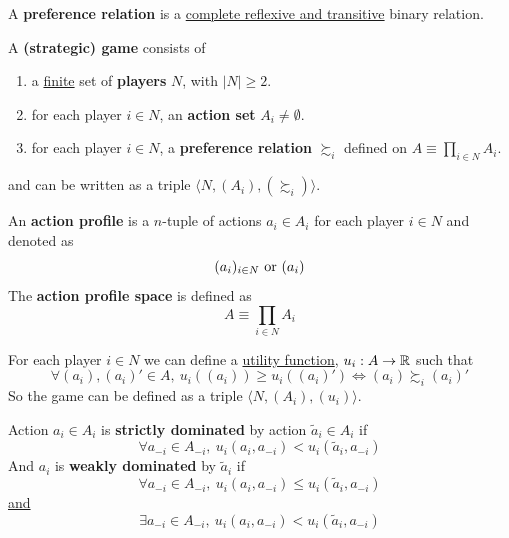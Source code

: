 \documentclass[11pt]{article}
\begin{document}
		\begin{definition}[pg.7]
			A \textbf{preference relation} is a \ul{complete reflexive and transitive} binary relation.
		\end{definition}
		
		\begin{definition}[11.1, lec.1]
			A \textbf{(strategic) game} consists of
			\begin{enumerate}[i]
				\item a \ul{finite} set of \textbf{players} $N$, with $|N| \geq 2$.
				\item for each player $i \in N$, an \textbf{action set} $A_i \neq \emptyset$.
				\item for each player $i \in N$, a \textbf{preference relation} $\succsim_i$ defined on $A \equiv \prod_{i\in N}A_i$.
			\end{enumerate}
			and can be written as a triple $\langle N, (A_i), (\succsim_i) \rangle$.
		\end{definition}

		\begin{definition}
			An \textbf{action profile} is a $n$-tuple of actions $a_i \in A_i$ for each player $i \in N$ and denoted as 
				\[
					(a_i)_{i \in N} \text{{ or }} (a_i)
				\]
			The \textbf{action profile space} is defined as 
				\[
					A \equiv \prod_{i \in N} A_i
				\]
		\end{definition}
		
		\begin{definition}
			For each player $i \in N$ we can define a \ul{utility function}, $u_i: A \to \mathbb{R}$ such that
			\begin{equation}
				\forall (a_i), (a_i)' \in A,\ u_i((a_i)) \geq u_i((a_i)') \iff (a_i) \succsim_i (a_i)'
			\end{equation}
			So the game can be defined as a triple $\langle N, (A_i), (u_i) \rangle$.
		\end{definition}
		
		\begin{definition}
			Action $a_i \in A_i$ is \textbf{strictly dominated} by action $\tilde{a}_i \in A_i$ if
			\[
				\forall a_{-i} \in A_{-i},\ u_i(a_i, a_{-i}) < u_i(\tilde{a}_i, a_{-i})
			\]
			And $a_i$ is \textbf{weakly dominated} by $\tilde{a}_i$ if
			\[
				\forall a_{-i} \in A_{-i},\ u_i(a_i, a_{-i}) \leq u_i(\tilde{a}_i, a_{-i})
			\]
			\ul{and}
			\[
				\exists a_{-i} \in A_{-i},\ u_i(a_i, a_{-i}) < u_i(\tilde{a}_i, a_{-i})
			\]
		\end{definition}
		
\end{document}
